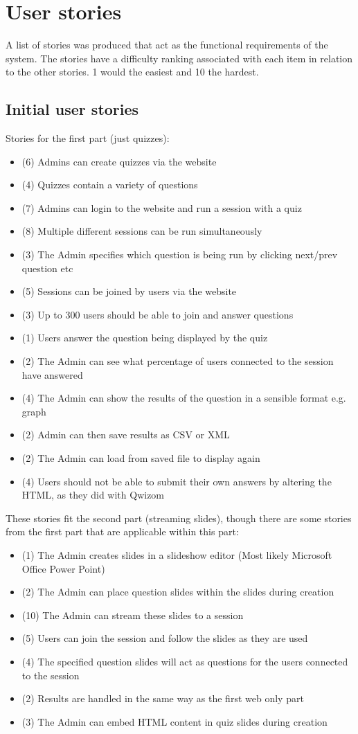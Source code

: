 \chapter{User stories}
\label{appendix:stories}
A list of stories was produced that act as the functional requirements of the system. The stories have a difficulty ranking associated with each item in relation to the other stories. 1 would the easiest and 10 the hardest.

\section{Initial user stories}
Stories for the first part (just quizzes):
\begin{itemize}
	\item (6) Admins can create quizzes via the website
	\item (4) Quizzes contain a variety of questions
	\item (7) Admins can login to the website and run a session with a quiz
	\item (8) Multiple different sessions can be run simultaneously
	\item (3) The Admin specifies which question is being run by clicking next/prev question etc
	\item (5) Sessions can be joined by users via the website
	\item (3) Up to 300 users should be able to join and answer questions
	\item (1) Users answer the question being displayed by the quiz
	\item (2) The Admin can see what percentage of users connected to the session have answered
	\item (4) The Admin can show the results of the question in a sensible format e.g. graph
	\item (2) Admin can then save results as CSV or XML
	\item (2) The Admin can load from saved file to display again
	\item (4) Users should not be able to submit their own answers by altering the HTML, as they did with Qwizom
\end{itemize}
These stories fit the second part (streaming slides), though there are some stories from the first part that are applicable within this part:
\begin{itemize}
	\item (1) The Admin creates slides in a slideshow editor (Most likely Microsoft Office Power Point)
	\item (2) The Admin can place question slides within the slides during creation
	\item (10) The Admin can stream these slides to a session
	\item (5) Users can join the session and follow the slides as they are used	
	\item (4) The specified question slides will act as questions for the users connected to the session
	\item (2) Results are handled in the same way as the first web only part
	\item (3) The Admin can embed HTML content in quiz slides during creation
\end{itemize}
